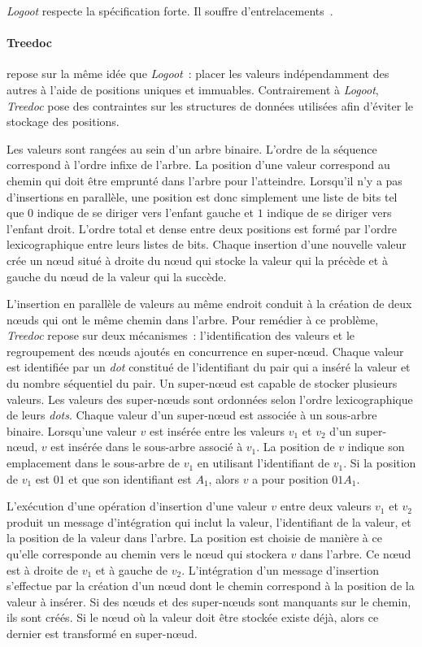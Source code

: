 \emph{Logoot} respecte la spécification forte.
Il souffre d'entrelacements~\autocite{kleppmann2019_interleaving}.


\paragraph{Treedoc}\autocite{preguica_2009_treedoc} repose sur la même idée que \emph{Logoot}~: placer les valeurs indépendamment des autres à l'aide de positions uniques et immuables.
Contrairement à \emph{Logoot}, \emph{Treedoc} pose des contraintes sur les structures de données utilisées afin d'éviter le stockage des positions.

Les valeurs sont rangées au sein d'un arbre binaire.
L'ordre de la séquence correspond à l'ordre infixe de l'arbre.
La position d'une valeur correspond au chemin qui doit être emprunté dans l'arbre pour l'atteindre.
Lorsqu'il n'y a pas d'insertions en parallèle, une position est donc simplement une liste de bits tel que $0$ indique de se diriger vers l'enfant gauche et $1$ indique de se diriger vers l'enfant droit.
L'ordre total et dense entre deux positions est formé par l'ordre lexicographique entre leurs listes de bits.
Chaque insertion d'une nouvelle valeur crée un nœud situé à droite du nœud qui stocke la valeur qui la précède et à gauche du nœud de la valeur qui la succède.

L'insertion en parallèle de valeurs au même endroit conduit à la création de deux nœuds qui ont le même chemin dans l'arbre.
Pour remédier à ce problème, \emph{Treedoc} repose sur deux mécanismes~: l'identification des valeurs et le regroupement des nœuds ajoutés en concurrence en super-nœud.
Chaque valeur est identifiée par un \emph{dot} constitué de l'identifiant du pair qui a inséré la valeur et du nombre séquentiel du pair.
Un super-nœud est capable de stocker plusieurs valeurs.
Les valeurs des super-nœuds sont ordonnées selon l'ordre lexicographique de leurs \emph{dots}.
Chaque valeur d'un super-nœud est associée à un sous-arbre binaire.
Lorsqu'une valeur $v$ est insérée entre les valeurs $v_1$ et $v_2$ d'un super-nœud, $v$ est insérée dans le sous-arbre associé à $v_1$.
La position de $v$ indique son emplacement dans le sous-arbre de $v_1$ en utilisant l'identifiant de $v_1$.
Si la position de $v_1$ est $01$ et que son identifiant est $A_1$, alors $v$ a pour position $01A_1$.

L'exécution d'une opération d'insertion d'une valeur $v$ entre deux valeurs $v_1$ et $v_2$ produit un message d'intégration qui inclut la valeur, l'identifiant de la valeur, et la position de la valeur dans l'arbre.
La position est choisie de manière à ce qu'elle corresponde au chemin vers le nœud qui stockera $v$ dans l'arbre.
Ce nœud est à droite de $v_1$ et à gauche de $v_2$.
L'intégration d'un message d'insertion s'effectue par la création d'un nœud dont le chemin correspond à la position de la valeur à insérer.
Si des nœuds et des super-nœuds sont manquants sur le chemin, ils sont créés.
Si le nœud où la valeur doit être stockée existe déjà, alors ce dernier est transformé en super-nœud.

